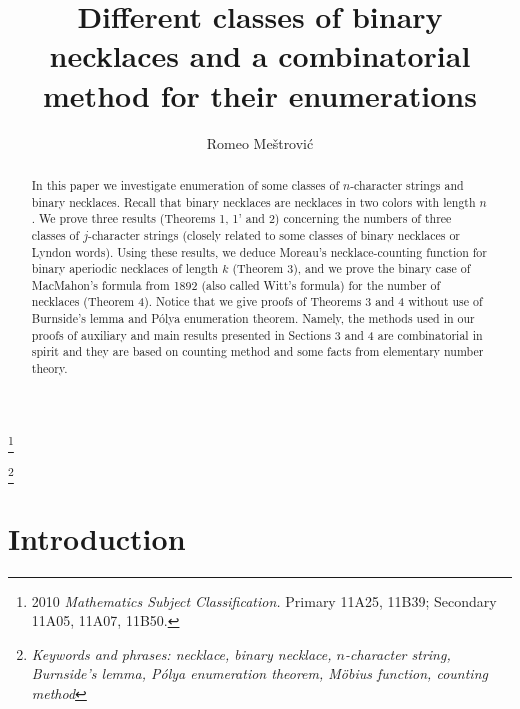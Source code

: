 \documentclass[12pt]{amsart}
\begin{document}
\title[Different classes of binary necklaces\ldots]{Different classes of binary 
necklaces and a combinatorial method for their enumerations}

\author{Romeo Me\v{s}trovi\'c}

\address{Maritime Faculty, University of Montenegro, Dobrota 36,
 85330 Kotor, Montenegro} 

\maketitle


{\renewcommand{\thefootnote}{}\footnote{2010 {\it Mathematics Subject 
Classification.} Primary 11A25,  11B39; Secondary 
 11A05,  11A07,  11B50.}




{\renewcommand{\thefootnote}{}\footnote{\it Keywords and phrases:
 necklace, binary necklace, $n$-character string, 
Burnside's lemma, 
P\'olya enumeration theorem, M\"{o}bius function, counting method}
  \setcounter{footnote}{0}}


 \begin{abstract}
In this paper  we investigate  enumeration of 
some classes of $n$-character strings and   binary   necklaces.
Recall that binary necklaces are necklaces  in two colors with length 
$n$. 
We prove three results (Theorems 1, 1' and  2)
 concerning the numbers of three classes of $j$-character strings
(closely related to some classes of binary necklaces or Lyndon words). 
Using these results, we deduce Moreau's necklace-counting function for 
binary aperiodic necklaces  of length 
$k$ \cite{mo}  (Theorem 3), and we prove the binary case of MacMahon's  
formula from 1892 \cite{ma} (also called Witt's formula) for the number of necklaces (Theorem 4).  
Notice that we give 
proofs of Theorems 3 and 4   
without use of Burnside's lemma  and P\'olya enumeration theorem.
Namely, the methods used in our proofs of auxiliary and  
main results presented in Sections 3 and 4 are  
combinatorial in spirit  and they are based on counting method
and  some facts from elementary number theory. 
  \end{abstract}



\section{Introduction}



}
\end{document}
